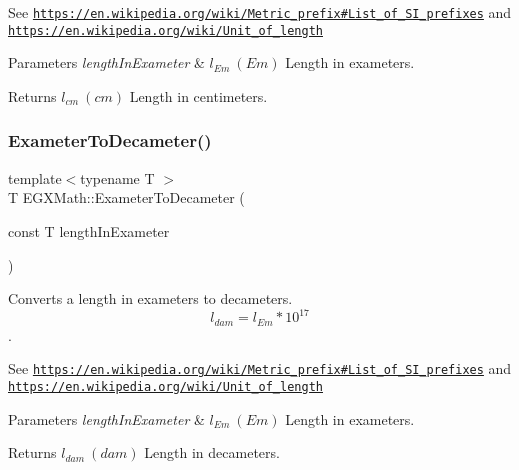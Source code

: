 See \href{https://en.wikipedia.org/wiki/Metric_prefix#List_of_SI_prefixes}{\tt https\+://en.\+wikipedia.\+org/wiki/\+Metric\+\_\+prefix\#\+List\+\_\+of\+\_\+\+S\+I\+\_\+prefixes} and \href{https://en.wikipedia.org/wiki/Unit_of_length}{\tt https\+://en.\+wikipedia.\+org/wiki/\+Unit\+\_\+of\+\_\+length} 
\begin{DoxyParams}{Parameters}
{\em length\+In\+Exameter} & $ l_{Em}\ (Em)$ Length in exameters. \\
\hline
\end{DoxyParams}
\begin{DoxyReturn}{Returns}
$ l_{cm}\ (cm)$ Length in centimeters. 
\end{DoxyReturn}
\mbox{\label{group___e_g_x_math-_conversions-_length_conversions-_s_i-_exameter-_s_i_ga06159c597dfa489a8981c261622bf574}} 
\subsubsection{\texorpdfstring{Exameter\+To\+Decameter()}{ExameterToDecameter()}}
{\footnotesize\ttfamily template$<$typename T $>$ \\
T E\+G\+X\+Math\+::\+Exameter\+To\+Decameter (\begin{DoxyParamCaption}\item[{const T}]{length\+In\+Exameter }\end{DoxyParamCaption})}



Converts a length in exameters to decameters. \[ l_{dam}=l_{Em} * 10^{17} \]. 

See \href{https://en.wikipedia.org/wiki/Metric_prefix#List_of_SI_prefixes}{\tt https\+://en.\+wikipedia.\+org/wiki/\+Metric\+\_\+prefix\#\+List\+\_\+of\+\_\+\+S\+I\+\_\+prefixes} and \href{https://en.wikipedia.org/wiki/Unit_of_length}{\tt https\+://en.\+wikipedia.\+org/wiki/\+Unit\+\_\+of\+\_\+length} 
\begin{DoxyParams}{Parameters}
{\em length\+In\+Exameter} & $ l_{Em}\ (Em)$ Length in exameters. \\
\hline
\end{DoxyParams}
\begin{DoxyReturn}{Returns}
$ l_{dam}\ (dam)$ Length in decameters. 
\end{DoxyReturn}
\mbox{\label{group___e_g_x_math-_conversions-_length_conversions-_s_i-_exameter-_s_i_ga6d2909e8189cfc7b07d846a34f277afb}} 
